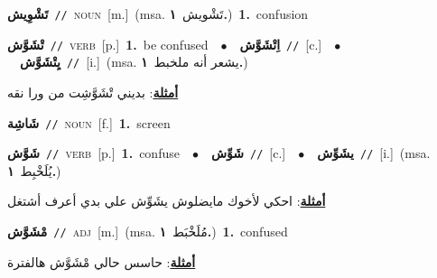 \documentclass[10pt,a4paper,twoside]{article} %
\begin{document}
\begin{multicols}{2}
{\setlength\topsep{0pt}\textbf{\foreignlanguage{arabic}{تَشْوِيش}}\ {\color{gray}\texttt{//}\color{black}}\ \textsc{noun}\ [m.]\ \color{gray}(msa. \foreignlanguage{arabic}{تَشْويش}~\foreignlanguage{arabic}{\textbf{١.}})\color{black}\ \textbf{1.}~confusion\ } \vspace{2mm}

{\setlength\topsep{0pt}\textbf{\foreignlanguage{arabic}{تْشَوَّش}}\ {\color{gray}\texttt{//}\color{black}}\ \textsc{verb}\ [p.]\ \textbf{1.}~be confused\ \ $\bullet$\ \ \setlength\topsep{0pt}\textbf{\foreignlanguage{arabic}{اِتْشَوَّش}}\ {\color{gray}\texttt{//}\color{black}}\ [c.]\ \ $\bullet$\ \ \setlength\topsep{0pt}\textbf{\foreignlanguage{arabic}{يِتْشَوَّش}}\ {\color{gray}\texttt{//}\color{black}}\ [i.]\ \color{gray}(msa. \foreignlanguage{arabic}{يشعر أنه ملخبط}~\foreignlanguage{arabic}{\textbf{١.}})\color{black}\  \begin{flushright}\color{gray}\foreignlanguage{arabic}{\textbf{\underline{\foreignlanguage{arabic}{أمثلة}}}: بديني تْشَوَّشِت من ورا نقه}\end{flushright}\color{black}} \vspace{2mm}

{\setlength\topsep{0pt}\textbf{\foreignlanguage{arabic}{شَاشِة}}\ {\color{gray}\texttt{//}\color{black}}\ \textsc{noun}\ [f.]\ \textbf{1.}~screen\ } \vspace{2mm}

{\setlength\topsep{0pt}\textbf{\foreignlanguage{arabic}{شَوَّش}}\ {\color{gray}\texttt{//}\color{black}}\ \textsc{verb}\ [p.]\ \textbf{1.}~confuse\ \ $\bullet$\ \ \setlength\topsep{0pt}\textbf{\foreignlanguage{arabic}{شَوِّش}}\ {\color{gray}\texttt{//}\color{black}}\ [c.]\ \ $\bullet$\ \ \setlength\topsep{0pt}\textbf{\foreignlanguage{arabic}{يشَوِّش}}\ {\color{gray}\texttt{//}\color{black}}\ [i.]\ \color{gray}(msa. \foreignlanguage{arabic}{يُلَخْبِط}~\foreignlanguage{arabic}{\textbf{١.}})\color{black}\  \begin{flushright}\color{gray}\foreignlanguage{arabic}{\textbf{\underline{\foreignlanguage{arabic}{أمثلة}}}: احكي لأخوك مايضلوش يشَوِّش علي بدي أعرف أشتغل}\end{flushright}\color{black}} \vspace{2mm}

{\setlength\topsep{0pt}\textbf{\foreignlanguage{arabic}{مْشَوَّش}}\ {\color{gray}\texttt{//}\color{black}}\ \textsc{adj}\ [m.]\ \color{gray}(msa. \foreignlanguage{arabic}{مُلَخْبَط}~\foreignlanguage{arabic}{\textbf{١.}})\color{black}\ \textbf{1.}~confused\  \begin{flushright}\color{gray}\foreignlanguage{arabic}{\textbf{\underline{\foreignlanguage{arabic}{أمثلة}}}: حاسس حالي مْشَوَّش  هالفترة}\end{flushright}\color{black}} \vspace{2mm}


\end{multicols}
\end{document}
